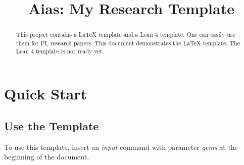\documentclass[acmsmall,screen,review,anonymous]{acmart}
\begin{document}
\title{Aias: My Research Template}

\begin{abstract}
  This project contains a LaTeX template and a Lean 4 template.
  One can easily use them for PL research papers.
  This document demonstrates the LaTeX template.
  The Lean 4 template is not ready yet.
\end{abstract}

\maketitle

\section{Quick Start}

\subsection{Use the Template}
To use this template,
insert an \emph{input} command with parameter \emph{gems}
at the beginning of the document.

\TODOit



\end{document}
